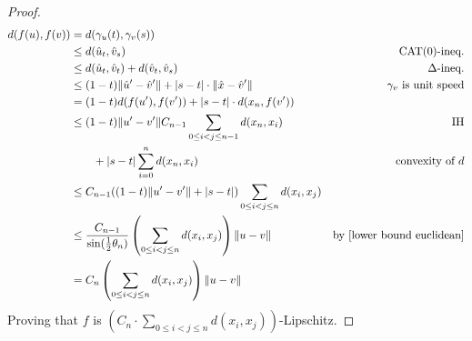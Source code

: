 \documentclass{amsart}
\numberwithin{equation}{section}
\theoremstyle{definition}
\begin{document}
\begin{proof}
    \begin{align*}
        d(f(u),f(v))&= d(\gamma_u(t),\gamma_v(s))\\
        &\le d(\hat u_t,\hat v_s) &\text{CAT(0)-ineq.}\\
        &\le d(\hat u_t,\hat v_t)+d(\hat v_t,\hat v_s) &\Delta\text{-ineq.}\\
        &\le (1-t)\|\hat u'-\hat v'\|+|s-t|\cdot \|\hat x-\hat v'\| &\gamma_v\text{ is unit speed}\\
        &= (1-t)d(f(u'),f(v'))+|s-t|\cdot d(x_n,f(v'))\\
        &\le (1-t)\|u'-v'\|C_{n-1}\sum_{0\le i<j\le n-1} d(x_n,x_i) &\text{IH}
        \\
        &\quad\quad + |s-t|\sum_{i=0}^nd(x_n,x_i) &\text{convexity of }d\\
        &\le C_{n-1}((1-t)\|u'-v'\|+|s-t|)\sum_{0\le i<j\le n}d(x_i,x_j)\\
        &\le \frac{C_{n-1}}{\sin(\tfrac12 \theta_n)} \left(\sum_{0\le i<j\le n}d(x_i,x_j)\right) \|u-v\| &\text{by \eqref{lower bound euclidean}}\\
        &=C_n\left(\sum_{0\le i<j\le n}d(x_i,x_j)\right)\|u-v\|
    \end{align*}
    Proving that $f$ is $\left(C_n\cdot \sum_{0\le i<j\le n}d(x_i,x_j)\right)$-Lipschitz.
\end{proof}
\end{document}
